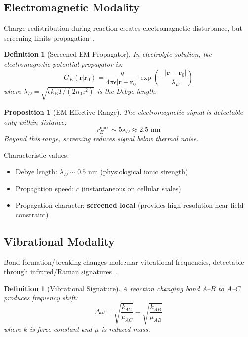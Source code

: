 \documentclass[11pt,a4paper]{article}
\newtheorem{definition}[theorem]{Definition}
\newtheorem{proposition}[theorem]{Proposition}
\theoremstyle{remark}
\newcommand{\kB}{k_{\mathrm{B}}}
\newcommand{\rxnpos}{\mathbf{r}_0}
\begin{document}
\subsection{Electromagnetic Modality}

Charge redistribution during reaction creates electromagnetic disturbance, but screening limits propagation~\citep{israelachvili2011intermolecular,netz2003electrostatistics}.

\begin{definition}[Screened EM Propagator]
In electrolyte solution, the electromagnetic potential propagator is:
\begin{equation}
    G_E(\mathbf{r} | \rxnpos) = \frac{q}{4\pi\epsilon |\mathbf{r} - \rxnpos|} \exp\left(-\frac{|\mathbf{r} - \rxnpos|}{\lambda_D}\right)
\end{equation}
where $\lambda_D = \sqrt{\epsilon \kB T / (2 n_0 e^2)}$ is the Debye length.
\end{definition}

\begin{proposition}[EM Effective Range]
\label{prop:em_range}
The electromagnetic signal is detectable only within distance:
\begin{equation}
    r_E^{\max} \sim 5\lambda_D \approx 2.5 \text{ nm}
\end{equation}
Beyond this range, screening reduces signal below thermal noise.
\end{proposition}

Characteristic values:
\begin{itemize}
    \item Debye length: $\lambda_D \sim 0.5$ nm (physiological ionic strength)
    \item Propagation speed: $c$ (instantaneous on cellular scales)
    \item Propagation character: \textbf{screened local} (provides high-resolution near-field constraint)
\end{itemize}

\subsection{Vibrational Modality}

Bond formation/breaking changes molecular vibrational frequencies, detectable through infrared/Raman signatures~\citep{stuart2004infrared,barth2007infrared}.

\begin{definition}[Vibrational Signature]
A reaction changing bond $A$--$B$ to $A$--$C$ produces frequency shift:
\begin{equation}
    \Delta\omega = \sqrt{\frac{k_{AC}}{\mu_{AC}}} - \sqrt{\frac{k_{AB}}{\mu_{AB}}}
\end{equation}
where $k$ is force constant and $\mu$ is reduced mass.
\end{definition}
\end{document}
